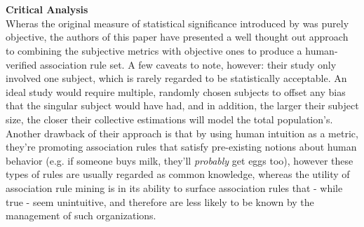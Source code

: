 \\\\\textbf{Critical Analysis}\\
Wheras the original measure of statistical significance introduced by  was purely objective, the authors  of this paper have presented a well thought out approach to combining the subjective metrics with objective ones to produce a human-verified association rule set.  A few caveats to note, however: their study only involved one subject, which is rarely regarded to be statistically acceptable. An ideal study would require multiple, randomly chosen subjects to offset any bias that the singular subject would have had, and in addition, the larger their subject size, the closer their collective estimations will model the total population's.  Another drawback of their approach is that by using human intuition as a metric,  they're promoting association rules that satisfy pre-existing notions about human behavior (e.g. if someone buys milk, they'll \textit{probably} get eggs too), however these types of rules are usually regarded as common knowledge,  whereas the utility of association rule mining is in its ability to surface association rules that - while true - seem unintuitive, and therefore are less likely to be known by the management of such organizations.


